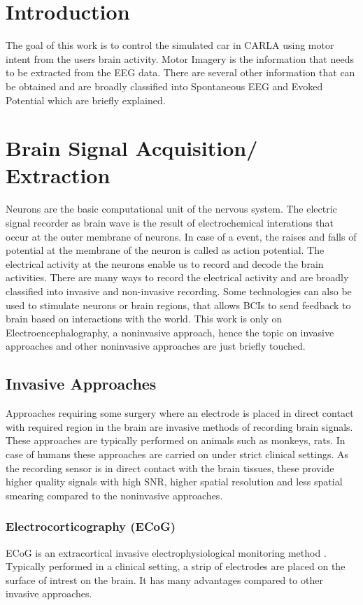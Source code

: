 \section*{Introduction}
    The goal of this work is to control the simulated car in CARLA using motor intent from the users brain activity. Motor Imagery is the information that needs to be extracted from the EEG data. There are several other information that can be  obtained and are broadly classified into Spontaneous EEG and Evoked Potential which are briefly explained.

\section{Brain Signal Acquisition/ Extraction}
Neurons are the basic computational unit of the nervous system. The electric signal recorder as brain wave is the result of electrochemical interations that occur at the outer membrane of neurons. In case of a event, the raises and falls of potential at the membrane of the neuron is called as action potential. The electrical activity at the neurons enable us to record and decode the brain activities. There are many ways to record the electrical activity and are broadly classified into invasive and non-invasive recording. Some technologies can also be used to stimulate neurons or brain regions, that allows BCIs to send feedback to brain based on interactions with the world. This work is only on Electroencephalography, a  noninvasive approach, hence the topic on invasive approaches and other noninvasive approaches are just briefly touched.

    \subsection{Invasive Approaches}
Approaches requiring some surgery where an electrode is placed in direct contact with required region in the brain are invasive methods of recording brain signals. These approaches are typically performed on animals such as monkeys, rats. In case of humans these approaches are carried on under strict clinical settings. As the recording sensor is in direct contact with the brain tissues, these provide higher quality signals with high SNR, higher spatial resolution and less spatial smearing compared to the noninvasive approaches.

    \subsubsection{Electrocorticography (ECoG)}
    ECoG is an extracortical invasive electrophysiological monitoring method \cite{2021}. Typically performed in a clinical setting, a strip of electrodes are placed on the surface of intrest on the brain. It has many advantages compared to other invasive approaches.

